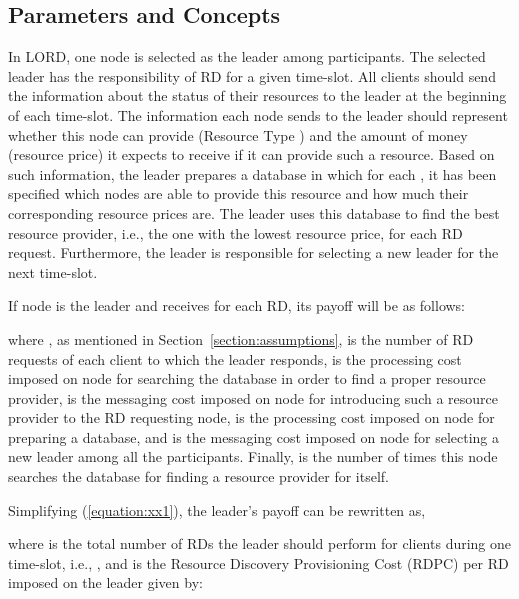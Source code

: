 \documentclass[journal,12pt, onecolumn]{IEEEtran}
\begin{document}
\subsection{Parameters and Concepts}\label{section:parameters}

In LORD, one node is selected as the leader among  participants. The selected leader has the responsibility of RD for a given time-slot. All clients should send the information about the status of their resources to the leader at the beginning of each time-slot. The information each node sends to the leader should represent whether this node can provide  (Resource Type ) and the amount of money (resource price) it expects to receive if it can provide such a resource. Based on such information, the leader prepares a database in which for each , it has been specified which nodes are able to provide this resource and how much their corresponding resource prices are. The leader uses this database to find the best resource provider, i.e., the one with the lowest resource price, for each RD request. Furthermore, the leader is responsible for selecting a new leader for the next time-slot.

If node  is the leader and receives  for each RD, its payoff will be as follows:

where , as mentioned in Section~\ref{section:assumptions}, is the number of RD requests of each client to which the leader responds,  is the processing cost imposed on node  for searching the database in order to find a proper resource provider,  is the messaging cost imposed on node  for introducing such a resource provider to the RD requesting node,  is the processing cost imposed on node  for preparing a database, and  is the messaging cost imposed on node  for selecting a new leader among all the participants.  Finally,  is the number of times this node searches the database for finding a resource provider for itself.



Simplifying (\ref{equation:xx1}), the leader's payoff can be rewritten as,

where  is the total number of RDs the leader should perform for clients during one time-slot, i.e., , and  is the Resource Discovery Provisioning Cost (RDPC) per RD imposed on the leader given by:
 
\end{document}
